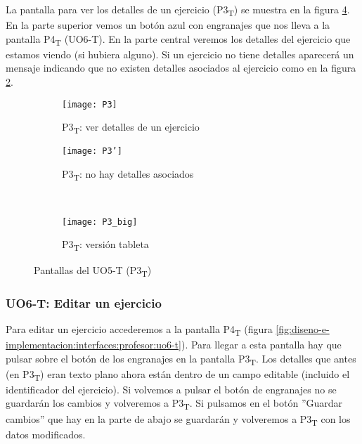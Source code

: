 La pantalla para ver los detalles de un ejercicio (P3\textsubscript{T}) se muestra en la figura \ref{fig:diseno-e-implementacion:interfaces:profesor:uo5-t}. En la parte superior vemos un botón azul con engranajes que nos lleva a la pantalla P4\textsubscript{T} (UO6-T). En la parte central veremos los detalles del ejercicio que estamos viendo (si hubiera alguno). Si un ejercicio no tiene detalles aparecerá un mensaje indicando que no existen detalles asociados al ejercicio como en la figura \ref{fig:diseno-e-implementacion:interfaces:profesor:uo5-t:p3'}.\\

\noindent
\begin{figure}[!htbp]
\begin{subfigure}[t]{0.5\textwidth}
	\centering
	\texttt{[image: P3]}
	\caption{P3\textsubscript{T}: ver detalles de un ejercicio}
	\label{fig:diseno-e-implementacion:interfaces:profesor:uo5-t:p3}
\end{subfigure}
%
\begin{subfigure}[t]{0.5\textwidth}
	\centering
	\texttt{[image: P3']}
	\caption{P3\textsubscript{T}: no hay detalles asociados}
	\label{fig:diseno-e-implementacion:interfaces:profesor:uo5-t:p3'}
\end{subfigure}
\\
\begin{subfigure}[t]{\textwidth}
	\centering
	\texttt{[image: P3\_big]}
	\caption{P3\textsubscript{T}: versión tableta}
	\label{fig:diseno-e-implementacion:interfaces:profesor:uo5-t:p3-big}
\end{subfigure}

\caption{Pantallas del UO5-T (P3\textsubscript{T})}
\label{fig:diseno-e-implementacion:interfaces:profesor:uo5-t}
\end{figure}

\subsubsection{UO6-T: Editar un ejercicio}
\label{diseno-e-implementacion:interfaces:profesor:uo6-t}

Para editar un ejercicio accederemos a la pantalla P4\textsubscript{T} (figura \ref{fig:diseno-e-implementacion:interfaces:profesor:uo6-t}). Para llegar a esta pantalla hay que pulsar sobre el botón de los engranajes en la pantalla P3\textsubscript{T}. Los detalles que antes (en P3\textsubscript{T}) eran texto plano ahora están dentro de un campo editable (incluido el identificador del ejercicio). Si volvemos a pulsar el botón de engranajes no se guardarán los cambios y volveremos a P3\textsubscript{T}. Si pulsamos en el botón ''Guardar cambios'' que hay en la parte de abajo se guardarán y volveremos a P3\textsubscript{T} con los datos modificados.\\

